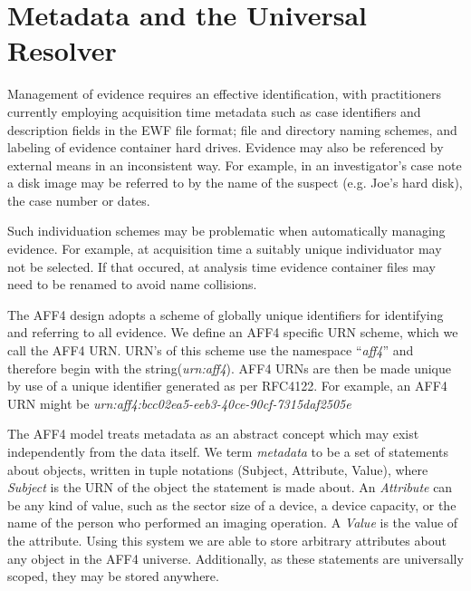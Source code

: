 \documentclass[10pt, conference]{IEEEtran}
\begin{document}
\section{Metadata and the Universal Resolver}
\label{resolver}

Management of evidence requires an effective identification, with
practitioners currently employing acquisition time metadata such as
case identifiers and description fields in the EWF file format; file
and directory naming schemes, and labeling of evidence container hard
drives. Evidence may also be referenced by external means in an
inconsistent way. For example, in an investigator's case note a disk
image may be referred to by the name of the suspect (e.g. Joe's hard
disk), the case number or dates.

Such individuation schemes may be problematic when automatically
managing evidence. For example, at acquisition time a suitably unique
individuator may not be selected. If that occured, at analysis time
evidence container files may need to be renamed to avoid name
collisions.

The AFF4 design adopts a scheme of globally unique identifiers for
identifying and referring to all evidence. We define an AFF4 specific
URN scheme, which we call the AFF4 URN. URN's of this scheme use the
namespace\cite{RFC1737} ``\emph{aff4}'' and therefore begin with the 
string(\emph{urn:aff4}). AFF4 URNs are then be made unique by use of 
a unique identifier generated
as per RFC4122\cite{RFC4122}. For example, an AFF4 URN might be
\emph{urn:aff4:bcc02ea5-eeb3-40ce-90cf-7315daf2505e}


The AFF4 model treats metadata as an abstract concept which may exist
independently from the data itself. We term {\em metadata} to be a set
of statements about objects, written in tuple notations (Subject,
Attribute, Value), where {\em Subject} is the URN of the object the
statement is made about. An \emph{Attribute} can be any kind of value, such
as the sector size of a device, a device capacity, or the name of the
person who performed an imaging operation. A \emph{Value} is the value
of the attribute. Using this system we are able to store
arbitrary attributes about any object in the AFF4
universe. Additionally, as these statements are universally scoped,
they may be stored anywhere.
\end{document}
